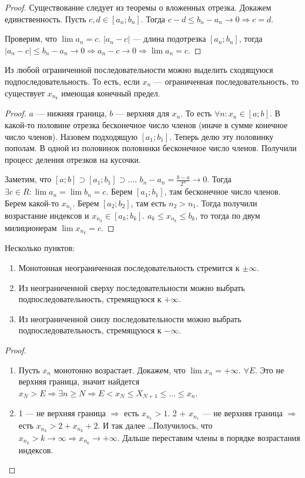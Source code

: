 \begin{proof}
    Существование следует из теоремы о вложенных отрезка. Докажем единственность. Пусть $c, d \in [a_n; b_n]$. Тогда  $c-d \le b_n - a_n \to 0 \Rightarrow c = d$.

    Проверим, что $\lim a_n=c$.  $|a_n - c|$ --- длина подотрезка  $[a_n; b_n]$, тогда $|a_n - c| \le b_n - a_n \to 0 \Rightarrow a_n - c \to 0 \Rightarrow \lim a_n = c$.
\end{proof}
\begin{theorem}
    Из любой ограниченной последовательности можно выделить сходящуюся подпоследовательность. То есть, если $x_n$ --- ограниченная последовательность, то существует  $x_{n_k}$ имеющая конечный предел.
\end{theorem}
\begin{proof}
    $a$ --- нижняя граница,  $b$ --- верхняя для  $x_n$. То есть  $\forall n: x_n \in [a; b]$. В какой-то половине отрезка бесконечное число членов (иначе в сумме конечное число членов). Назовем подходящую $[a_1;b_1]$. Теперь делю эту половинку пополам. В одной из половинок половинки бесконечное число членов. Получили процесс деления отрезков на кусочки. 

    Заметим, что $[a; b] \supset [a_1; b_1] \supset \ldots$. $b_n - a_n = \frac{b-a}{2^n} \to 0$. Тогда $\exists c \in R: \lim a_n = \lim b_n = c$. Берем  $[a_1; b_1]$, там бесконечное число членов. Берем какой-то $x_{n_1}$. Берем $[a_2; b_2]$, там есть  $n_2 > n_1$. Тогда получили возрастание индексов и  $x_{n_k} \in [a_k; b_k]$.  $a_k \le x_{n_k} \le b_k$, то тогда по двум милиционерам $\lim x_{n_k} = c$.
\end{proof}
\begin{theorem}
    Несколько пунктов:
    \begin{enumerate}
        \item Монотонная неограниченная последовательность стремится к $\pm\infty$.
        \item Из неограниченной сверху последовательности можно выбрать подпоследовательность, стремящуюся к $+\infty$.
        \item Из неограниченной снизу последовательности можно выбрать подпоследовательность, стремящуюся к $-\infty$.
    \end{enumerate}
\end{theorem}
\begin{proof}
    \slashn
    \begin{enumerate}
        \item Пусть $x_n$ монотонно возрастает. Докажем, что  $\lim x_n = +\infty$. $\forall E$. Это не верхняя граница, значит найдется  $x_N > E \Rightarrow \exists n \ge N \Rightarrow E < x_N \le X_{N+1} \le \ldots \le x_n$.
        \item 1 --- не верхняя граница $\Rightarrow$ есть  $x_{n_1} > 1$. 2 +  $x_{n_1}$ ---  не верхняя граница $\Rightarrow$ есть  $x_{n_k} > 2 + x_{n_k} + 2$. И так далее \ldots Получилось, что $x_{n_k} > k \to \infty \Rightarrow x_{n_k} \to +\infty$. Дальше переставим члены в порядке возрастания индексов.
    \end{enumerate}
\end{proof}
